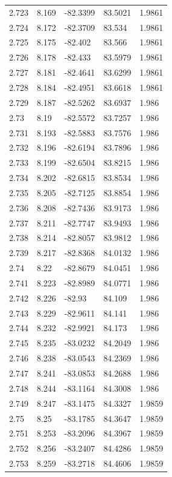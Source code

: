 \begin{tabular}{lllll}
2.723 & 8.169 & -82.3399 & 83.5021 & 1.9861 \\
2.724 & 8.172 & -82.3709 & 83.534 & 1.9861 \\
2.725 & 8.175 & -82.402 & 83.566 & 1.9861 \\
2.726 & 8.178 & -82.433 & 83.5979 & 1.9861 \\
2.727 & 8.181 & -82.4641 & 83.6299 & 1.9861 \\
2.728 & 8.184 & -82.4951 & 83.6618 & 1.9861 \\
2.729 & 8.187 & -82.5262 & 83.6937 & 1.986 \\
2.73 & 8.19 & -82.5572 & 83.7257 & 1.986 \\
2.731 & 8.193 & -82.5883 & 83.7576 & 1.986 \\
2.732 & 8.196 & -82.6194 & 83.7896 & 1.986 \\
2.733 & 8.199 & -82.6504 & 83.8215 & 1.986 \\
2.734 & 8.202 & -82.6815 & 83.8534 & 1.986 \\
2.735 & 8.205 & -82.7125 & 83.8854 & 1.986 \\
2.736 & 8.208 & -82.7436 & 83.9173 & 1.986 \\
2.737 & 8.211 & -82.7747 & 83.9493 & 1.986 \\
2.738 & 8.214 & -82.8057 & 83.9812 & 1.986 \\
2.739 & 8.217 & -82.8368 & 84.0132 & 1.986 \\
2.74 & 8.22 & -82.8679 & 84.0451 & 1.986 \\
2.741 & 8.223 & -82.8989 & 84.0771 & 1.986 \\
2.742 & 8.226 & -82.93 & 84.109 & 1.986 \\
2.743 & 8.229 & -82.9611 & 84.141 & 1.986 \\
2.744 & 8.232 & -82.9921 & 84.173 & 1.986 \\
2.745 & 8.235 & -83.0232 & 84.2049 & 1.986 \\
2.746 & 8.238 & -83.0543 & 84.2369 & 1.986 \\
2.747 & 8.241 & -83.0853 & 84.2688 & 1.986 \\
2.748 & 8.244 & -83.1164 & 84.3008 & 1.986 \\
2.749 & 8.247 & -83.1475 & 84.3327 & 1.9859 \\
2.75 & 8.25 & -83.1785 & 84.3647 & 1.9859 \\
2.751 & 8.253 & -83.2096 & 84.3967 & 1.9859 \\
2.752 & 8.256 & -83.2407 & 84.4286 & 1.9859 \\
2.753 & 8.259 & -83.2718 & 84.4606 & 1.9859 \\

\end{tabular}
